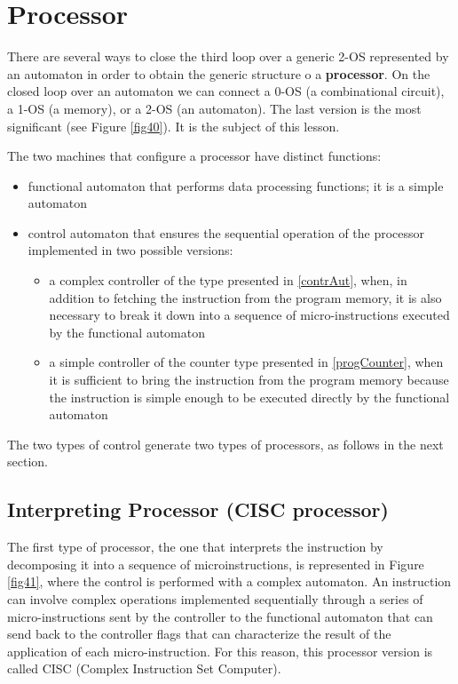 \section{Processor}

There are several ways to close the third loop over a generic 2-OS represented by an automaton in order to obtain the generic structure o a {\bf processor}. On the closed loop over an automaton we can connect a 0-OS (a combinational circuit), a 1-OS (a memory), or a 2-OS (an automaton). The last version is the most significant (see Figure \ref{fig40}). It is the subject of this lesson.

The two machines that configure a processor have distinct functions:
\begin{itemize}
\item functional automaton that performs data processing functions; it is a simple automaton

\item control automaton that ensures the sequential operation of the processor implemented in two possible versions:
\begin{itemize}
\item  a complex controller of the type presented in \ref{contrAut}, when, in addition to fetching the instruction from the program memory, it is also necessary to break it down into a sequence of micro-instructions executed by the functional automaton
\item  a simple controller of the counter type presented in \ref{progCounter}, when it is sufficient to bring the instruction from the program memory because the instruction is simple enough to be executed directly by the functional automaton
\end{itemize}

\end{itemize}


The two types of control generate two types of processors, as follows in the next section.



\subsection{Interpreting Processor (CISC processor)}

The first type of processor, the one that interprets the instruction by decomposing it into a sequence of microinstructions, is represented in Figure \ref{fig41}, where the control is performed with a complex automaton. An instruction can involve complex operations implemented sequentially through a series of micro-instructions sent by the controller to the functional automaton that can send back to the controller flags that can characterize the result of the application of each micro-instruction. For this reason, this processor version is called CISC (Complex Instruction Set Computer).

